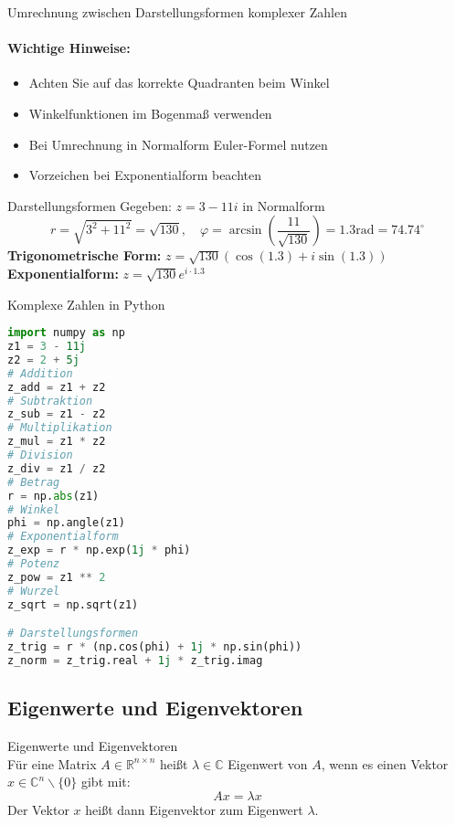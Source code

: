\begin{KR}{Umrechnung zwischen Darstellungsformen komplexer Zahlen}
\paragraph{Wichtige Hinweise:}
\begin{itemize}
   \item Achten Sie auf das korrekte Quadranten beim Winkel
   \item Winkelfunktionen im Bogenmaß verwenden
   \item Bei Umrechnung in Normalform Euler-Formel nutzen
   \item Vorzeichen bei Exponentialform beachten
\end{itemize}

\end{KR}

\begin{example2}{Darstellungsformen}
Gegeben: $z = 3 - 11i$ in Normalform
$$r = \sqrt{3^2 + 11^2} = \sqrt{130}, \quad \varphi = \arcsin(\frac{11}{\sqrt{130}}) = 1.3 \text{rad} = 74.74^{\circ}$$
\textbf{Trigonometrische Form:} $z = \sqrt{130}(\cos(1.3) + i\sin(1.3))$
\vspace{2mm}\\
\textbf{Exponentialform:} $z = \sqrt{130}e^{i\cdot 1.3}$
\end{example2}



\begin{examplecode}{Komplexe Zahlen in Python}
\begin{lstlisting}[language=Python, style=basesmol]
import numpy as np
z1 = 3 - 11j
z2 = 2 + 5j
# Addition
z_add = z1 + z2
# Subtraktion
z_sub = z1 - z2
# Multiplikation
z_mul = z1 * z2
# Division
z_div = z1 / z2
# Betrag
r = np.abs(z1)
# Winkel
phi = np.angle(z1)
# Exponentialform
z_exp = r * np.exp(1j * phi)
# Potenz
z_pow = z1 ** 2
# Wurzel
z_sqrt = np.sqrt(z1)

# Darstellungsformen
z_trig = r * (np.cos(phi) + 1j * np.sin(phi))
z_norm = z_trig.real + 1j * z_trig.imag
\end{lstlisting}
\end{examplecode}

\columnbreak

\subsection{Eigenwerte und Eigenvektoren}

\begin{definition}{Eigenwerte und Eigenvektoren}\\
Für eine Matrix $A \in \mathbb{R}^{n\times n}$ heißt $\lambda \in \mathbb{C}$ Eigenwert von $A$, wenn es einen Vektor $x \in \mathbb{C}^n \backslash \{0\}$ gibt mit:
$$Ax = \lambda x$$
Der Vektor $x$ heißt dann Eigenvektor zum Eigenwert $\lambda$.
\end{definition}

